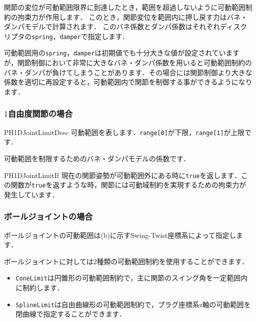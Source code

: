 \KLUDGE 関節の変位が可動範囲限界に到達したとき，範囲を超過しないように可動範囲制約の拘束力が作用します．
\KLUDGE このとき，関節変位を範囲内に押し戻す力はバネ・ダンパモデルで計算されます．
\KLUDGE このバネ係数とダンパ係数はそれぞれディスクリプタの\texttt{spring}，\texttt{damper}で指定します．

\begin{tips}
\KLUDGE 可動範囲用の\texttt{spring}，\texttt{damper}は初期値でも十分大きな値が設定されていますが，関節制御において非常に大きなバネ・ダンパ係数を用いると可動範囲制約のバネ・ダンパが負けてしまうことがあります．その場合には関節制御より大きな係数を適切に再設定すると，可動範囲内で関節を制御する事ができるようになります．
\end{tips}


\subsubsection*{$1$自由度関節の場合}

\begin{reference}{PH1DJointLimitDesc}
\KLUDGE 可動範囲を表します．\texttt{range[0]}が下限，\texttt{range[1]}が上限です．

 \Plus
{}
\KLUDGE 可動範囲を制限するためのバネ・ダンパモデルの係数です．
\end{reference}

\begin{reference}{PH1DJointLimitIf}
\KLUDGE 現在の関節姿勢が可動範囲外にある時に\texttt{true}を返します．この関数が\texttt{true}を返すような時，関節には可動域制約を実現するための拘束力が発生しています．
\end{reference}


\subsubsection*{ボールジョイントの場合}

\KLUDGE ボールジョイントの可動範囲は(b)に示すSwing-Twist座標系によって指定します．

\KLUDGE ボールジョイントに対しては2種類の可動範囲制約を使用することができます．
\begin{itemize}
\item \texttt{ConeLimit}は円錐形の可動範囲制約で，主に関節のスイング角を一定範囲内に制約します．
\item \texttt{SplineLimit}は自由曲線形の可動範囲制約で，プラグ座標系z軸の可動範囲を閉曲線で指定することができます．
\end{itemize}

